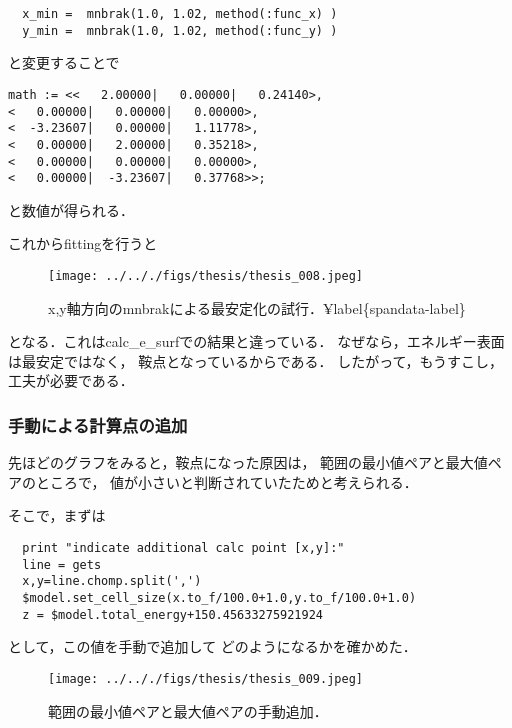 \documentclass[11pt,dvipdfmx]{jsarticle}
\begin{document}
\begin{verbatim}
  x_min =  mnbrak(1.0, 1.02, method(:func_x) )
  y_min =  mnbrak(1.0, 1.02, method(:func_y) )
\end{verbatim}

と変更することで

\begin{verbatim}
math := <<   2.00000|   0.00000|   0.24140>,
<   0.00000|   0.00000|   0.00000>,
<  -3.23607|   0.00000|   1.11778>,
<   0.00000|   2.00000|   0.35218>,
<   0.00000|   0.00000|   0.00000>,
<   0.00000|  -3.23607|   0.37768>>;
\end{verbatim}

と数値が得られる．

これからfittingを行うと

\begin{figure}[H]
\centering
\begin{center}
\texttt{[image: ../.././figs/thesis/thesis\_008.jpeg]}
\end{center}
\caption{x,y軸方向のmnbrakによる最安定化の試行．¥label\{spandata-label\}}

\label{fig:}
\end{figure}

となる．これはcalc\_e\_surfでの結果と違っている．
なぜなら，エネルギー表面は最安定ではなく， 鞍点となっているからである．
したがって，もうすこし，工夫が必要である．

    \subsubsection{手動による計算点の追加}\label{ux624bux52d5ux306bux3088ux308bux8a08ux7b97ux70b9ux306eux8ffdux52a0}

先ほどのグラフをみると，鞍点になった原因は，
範囲の最小値ペアと最大値ペアのところで，
値が小さいと判断されていたためと考えられる．

そこで，まずは

\begin{verbatim}
  print "indicate additional calc point [x,y]:"
  line = gets
  x,y=line.chomp.split(',')
  $model.set_cell_size(x.to_f/100.0+1.0,y.to_f/100.0+1.0)
  z = $model.total_energy+150.45633275921924
\end{verbatim}

として，この値を手動で追加して どのようになるかを確かめた．

\begin{figure}[H]
\centering
\begin{center}
\texttt{[image: ../.././figs/thesis/thesis\_009.jpeg]}
\end{center}
\caption{範囲の最小値ペアと最大値ペアの手動追加．\label{spandata-label}}

\label{fig:}
\end{figure}
\end{document}

